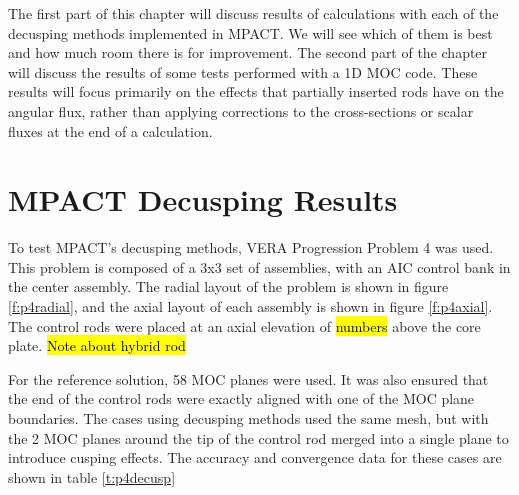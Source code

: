 The first part of this chapter will discuss results of calculations with each of the decusping methods implemented in MPACT.  We will see which of them is best and how much room there is for improvement.  The second part of the chapter will discuss the results of some tests performed with a 1D MOC code.  These results will focus primarily on the effects that partially inserted rods have on the angular flux, rather than applying corrections to the cross-sections or scalar fluxes at the end of a calculation.

\section{MPACT Decusping Results}

To test MPACT's decusping methods, VERA Progression Problem 4 \cite{VERAProgressionProblems} was used.  This problem is composed of a 3x3 set of assemblies, with an AIC control bank in the center assembly.  The radial layout of the problem is shown in figure \ref{f:p4radial}, and the axial layout of each assembly is shown in figure \ref{f:p4axial}.  The control rods were placed at an axial elevation of \hl{numbers} above the core plate. \hl{Note about hybrid rod}

For the reference solution, 58 MOC planes were used.  It was also ensured that the end of the control rods were exactly aligned with one of the MOC plane boundaries.  The cases using decusping methods used the same mesh, but with the 2 MOC planes around the tip of the control rod merged into a single plane to introduce cusping effects.  The accuracy and convergence data for these cases are shown in table \ref{t:p4decusp}

